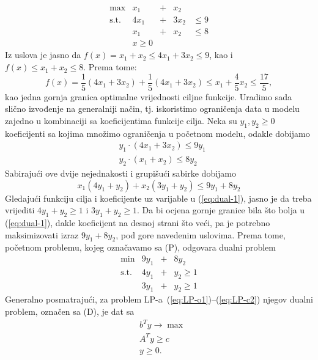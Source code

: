 \documentclass[a4paper, utf8, 11pt, colorlinks]{article}
\begin{document}
$$ 
\begin{array}{ccccc}
    \max                  &x_1 &+& x_2   &               \\
    \mbox{s.t.}  &4x_1 & +&3 x_2 & \leq 9        \\
                          &x_1 &+ &x_2   &  \leq 8       \\
                          &x \geq 0  &  &     &      
 \end{array}
$$
Iz uslova je jasno da $f(x) = x_1 + x_2 \leq 4 x_1 + 3 x_2 \leq 9$, kao i 
$f(x) \leq x_1 + x_2 \leq 8$. Prema tome:
$$f(x) = \frac{1}{5}(  4 x_1 + 3 x_2  ) + \frac{1}{5}(  4 x_1 + 3 x_2 ) \leq x_1 + \frac{4}{5}x_2 \leq \frac{17}{5},$$ kao jedna gornja granica optimalne vrijednosti ciljne funkcije. 
Uradimo sada slično izvođenje na generalniji način, tj. iskoristimo ograničenja data u modelu zajedno u kombinaciji sa koeficijentima funkcije cilja. Neka su $y_1, y_2 \geq 0$ koeficijenti sa kojima množimo ograničenja u početnom modelu, odakle dobijamo 
\begin{align*}
    &y_1 \cdot (4x_1 + 3x_2) \leq 9 y_1 \\
    &y_2 \cdot (x_1 + x_2 ) \leq 8 y_2 
\end{align*}
Sabirajući ove dvije nejednakosti i grupišući sabirke dobijamo 
\begin{equation}\label{eq:dual-1}
     x_1 ( 4 y_1 + y_2 ) + x_2 ( 3 y_1 + y_2 ) \leq 9 y_1 + 8 y_2 
\end{equation}
Gledajući funkciju cilja i koeficijente uz varijable u (\ref{eq:dual-1}), jasno je da treba vrijediti 
$4 y_1 + y_2 \geq 1$ i $3 y_1 + y_2 \geq 1$. Da bi ocjena gornje granice bila što bolja u (\ref{eq:dual-1}), dakle koeficijent na desnoj strani što veći, pa je potrebno maksimizovati izraz $9y_1 + 8 y_2$, pod gore navedenim uslovima. Prema tome, početnom problemu, kojeg označavamo sa (P), odgovara dualni problem 
$$\begin{array}{cccc}
     \min                    &  9 y_1 &+& 8 y_2        \\
     \mbox{s.t. }     &  4 y_1 &+& y_2 \geq 1   \\
                             &  3 y_1 &+& y_2 \geq 1
\end{array}$$
Generalno posmatrajući, za problem LP-a~(\ref{eq:LP-o1})--(\ref{eq:LP-c2}) njegov dualni problem, označen sa (D), je dat sa 
\begin{align}
     & b^T y \rightarrow \max \\
     & A^T y \geq c \\
     & y \geq 0.
\end{align}
\end{document}
